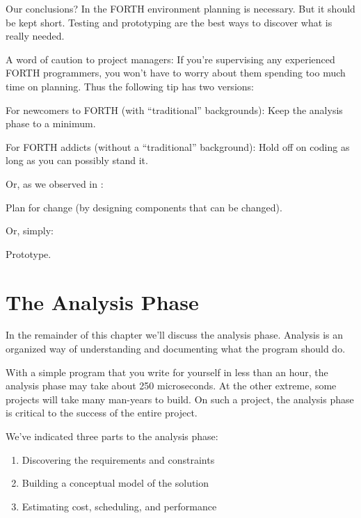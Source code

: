 \noindent Our conclusions? In the FORTH environment planning is necessary. But
it should be kept short. Testing and prototyping are the best ways to
discover what is really needed.

A word of caution to project managers: If you're supervising any
experienced FORTH programmers, you won't have to worry about them
spending too much time on planning. Thus the following tip has two
versions:

\begin{tip}
For newcomers to FORTH (with ``traditional'' backgrounds):
Keep the analysis phase to a minimum.

For FORTH addicts (without a ``traditional'' background):
Hold off on coding as long as you can possibly stand it.
\end{tip}
Or, as we observed in :

\begin{tip}
Plan for change (by designing components that can be changed).
\end{tip}
Or, simply:

\begin{tip}
Prototype.
\end{tip}

\section{The Analysis Phase}

In the remainder of this chapter we'll discuss the analysis phase.
Analysis is an organized way of understanding and documenting what
the program should do.

With a simple program that you write for yourself in less than an
hour, the analysis phase may take about 250 microseconds. At the other
extreme, some projects will take many man-years to build. On such a
project, the analysis phase is critical to the success of the entire project.

We've indicated three parts to the analysis phase:

\begin{enumerate}	%
\item Discovering the requirements and constraints
\item Building a conceptual model of the solution
\item Estimating cost, scheduling, and performance
\end{enumerate}

